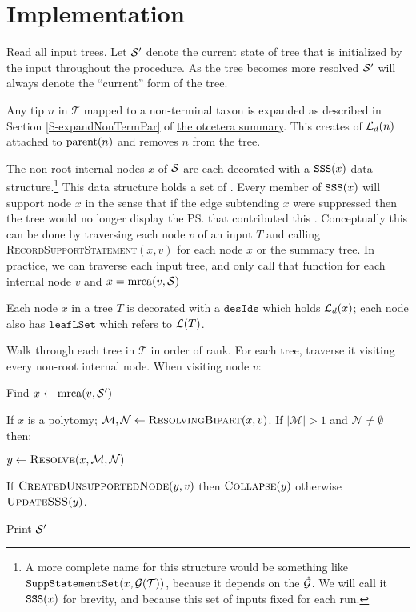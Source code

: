 \documentclass[11pt]{article}
\newcommand{\summDoc}{\href{http://phylo.bio.ku.edu/ot/summarizing-taxonomy-plus-trees.pdf}{the otcetera summary}\xspace}
\newcommand{\summRef}[1]{Section \ref{S-#1} of \summDoc}
\begin{document}
\section*{Implementation}
\begin{compactenum}
    \item Read all input trees. Let $\mathcal{S}^{\prime}$ denote the current state of tree that is initialized by the input
    \summaryTree throughout the procedure. 
    As the tree becomes more resolved $\mathcal{S}^{\prime}$ will always denote the ``current'' form of the tree.
    \item Any tip $n$ in $\mathcal{T}$ mapped to a non-terminal taxon is expanded as described in \summRef{expandNonTermPar}.
    This creates of $\mathcal{L}_d(n)$ attached to $\mbox{parent}(n)$ and removes $n$ from the tree.
    \item The non-root internal nodes $x$ of $\mathcal{S}$ are each decorated with a  $\mbox{\texttt{SSS}}(x)$ data structure.\footnote{A
    more complete name for this structure would be something like $\mbox{\texttt{SuppStatementSet}}(x, \mathcal{G}(\mathcal{T}))$,
    because it depends on the $\hat{\mathcal{G}}$.
    We will call it $\mbox{\texttt{SSS}}(x)$ for brevity, and because this set of inputs fixed for each run.}
    This data structure holds a set of  {\incLSSSs}.
    Every member of $\mbox{\texttt{SSS}}(x)$ will support node $x$ in the
    sense that if the edge subtending $x$ were suppressed then the tree would no longer 
    display the \ps that contributed this \incLSSS.
    Conceptually this can be done by traversing each node $v$ of an input $T$
    and calling \textsc{RecordSupportStatement}$(x, v)$ for each node $x$ or the summary tree.
    In practice, we can traverse each input tree, and only call that function for each internal node $v$ and $x=\mbox{mrca}(v, \mathcal{S})$
    \item Each node $x$ in a tree $T$ is decorated with a $\texttt{desIds}$ which holds $\mathcal{L}_d(x)$;
    each node also has $\texttt{leafLSet}$ which refers to $\mathcal{L}(T)$.
    \item Walk through each tree in $\mathcal{T}$ in order of rank. For each tree, 
    traverse it visiting every non-root internal node.
    When visiting node $v$:
    \begin{compactenum}
        \item Find $x \leftarrow \mbox{mrca}(v, \mathcal{S}^{\prime})$
        \item If $x$ is a polytomy; $\mathcal{M}, \mathcal{N} \leftarrow \textsc{ResolvingBipart}(x, v)$. If $|\mathcal{M}| > 1$ and $\mathcal{N}\neq \emptyset$ then:
         \begin{compactenum}
            \item  $y\leftarrow \textsc{Resolve}(x, \mathcal{M}, \mathcal{N})$
            \item If $\textsc{CreatedUnsupportedNode}(y, v)$ then $\textsc{Collapse}(y)$ otherwise $\textsc{UpdateSSS}(y)$.
        \end{compactenum}
   \end{compactenum}
   \item Print $\mathcal{S}^{\prime}$
\end{compactenum}
\end{document}
